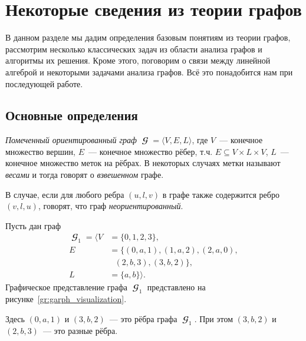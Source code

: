 \setchapterpreamble[u]{\margintoc}
\chapter{Некоторые сведения из теории графов}
\label{chpt:GraphTheoryIntro}

В данном разделе мы дадим определения базовым понятиям из теории графов, рассмотрим несколько классических задач из области анализа графов и алгоритмы их решения.
Кроме этого, поговорим о связи между линейной алгеброй и некоторыми задачами анализа графов.
Всё это понадобится нам при последующей работе.

\section{Основные определения}

\begin{definition}
    \emph{Помеченный ориентированный граф} $\mbfscrG = \langle V, E, L \rangle$, где $V$~--- конечное множество вершин, $E$~--- конечное множество рёбер, т.ч. $E \subseteq V \times L \times V$, $L$~--- конечное множество меток на рёбрах.
    В некоторых случаях метки называют \emph{весами}%
    и тогда говорят о \emph{взвешенном} графе.
\end{definition}

\begin{definition}
    В случае, если для любого ребра $(u, l, v)$ в графе также содержится ребро $(v, l, u)$, говорят, что граф \emph{неориентированный}.
\end{definition}

\begin{example}\label{exmpl:garph_visualization}
    Пусть дан граф
    \begin{align*}
        \mbfscrG_1 = \langle V & =\{0, 1, 2, 3\},                    \\
        E                      & =\{(0, a, 1), (1, a, 2), (2, a, 0), \\
                               & \ \ \ (2, b, 3), (3, b, 2)\},       \\
        L                      & =\{a, b\} \rangle.
    \end{align*}
    Графическое представление графа $\mbfscrG_1$ представлено на рисунке~\ref{gr:garph_visualization}.
    \begin{marginfigure}
        \begin{center}
            \resizebox{\marginparwidth}{!}{}
        \end{center}
        \caption{Визуальное представление графа из примера~\ref{exmpl:garph_visualization}}
        \label{gr:garph_visualization}
    \end{marginfigure}

    Здесь $(0, a, 1)$ и $(3,b,2)$~--- это рёбра графа $\mbfscrG_1$.
    При этом $(3, b, 2)$ и $(2, b, 3)$~--- это разные рёбра.
\end{example}

